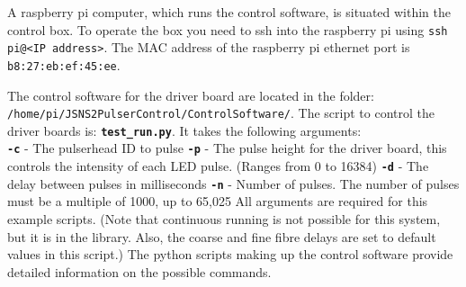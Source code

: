 A raspberry pi computer, which runs the control software, is situated within the control box. To operate the box you need to ssh into the raspberry pi using \texttt{ssh pi@<IP address>}. The MAC address of the raspberry pi ethernet port is \texttt{b8:27:eb:ef:45:ee}.

The control software for the driver board are located in the folder: \texttt{/home/pi/JSNS2PulserControl/ControlSoftware/}.
The script to control the driver boards is: \texttt{\textbf{test\_run.py}}.
It takes the following arguments:\\
\newline
\texttt{\textbf{-c}} - The pulserhead ID to pulse \newline
\texttt{\textbf{-p}} - The pulse height for the driver board, this controls the intensity of each LED pulse. (Ranges from 0 to 16384)\newline
\texttt{\textbf{-d}} - The delay between pulses in milliseconds \newline
\texttt{\textbf{-n}} - Number of pulses. The number of pulses must be a multiple of 1000, up to 65,025
\newline
All arguments are required for this example scripts. (Note that continuous running is not possible for this system, but it is in the library. Also, the coarse and fine fibre delays are set to default values in this script.) The python scripts making up the control software provide detailed information on the possible commands.
